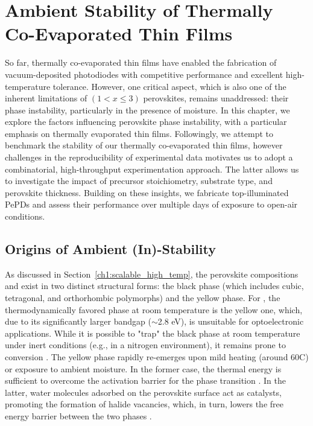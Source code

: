 \chapter{Ambient Stability of Thermally Co-Evaporated  Thin Films}\label{ch:stability}


So far, thermally co-evaporated  thin films have enabled the fabrication of vacuum-deposited photodiodes with competitive performance and excellent high-temperature tolerance. However, one critical aspect, which is also one of the inherent limitations of  $(1<x\leq3)$ perovskites, remains unaddressed: their phase instability, particularly in the presence of moisture. In this chapter, we explore the factors influencing perovskite phase instability, with a particular emphasis on thermally evaporated thin films. Followingly, we attempt to benchmark the stability of our thermally co-evaporated  thin films, however challenges in the reproducibility of experimental data motivates us to adopt a combinatorial, high-throughput experimentation approach. The latter allows us to investigate the impact of precursor stoichiometry, substrate type, and perovskite thickness. Building on these insights, we fabricate top-illuminated PePDs and assess their performance over multiple days of exposure to open-air conditions.


\section{Origins of Ambient (In)-Stability}

As discussed in Section~\ref{ch1:scalable_high_temp}, the perovskite compositions  and  exist in two distinct structural forms: the black phase (which includes cubic, tetragonal, and orthorhombic polymorphs) and the yellow phase. For , the thermodynamically favored phase at room temperature is the yellow one, which, due to its significantly larger bandgap ($\sim$2.8 eV), is unsuitable for optoelectronic applications. While it is possible to "trap" the black phase at room temperature under inert conditions (e.g., in a nitrogen environment), it remains prone to conversion \cite{Steele2021TrojansPerovskite}. The yellow phase rapidly re-emerges upon mild heating (around 60\degree C) or exposure to ambient moisture. In the former case, the thermal energy is sufficient to overcome the activation barrier for the phase transition \cite{Steele2019ThermalFilms}. In the latter, water molecules adsorbed on the perovskite surface act as catalysts, promoting the formation of halide vacancies, which, in turn, lowers the free energy barrier between the two phases \cite{Dastidar2016HighIodide, Kang2017HighCsPbBr3, Lin2018ThermochromicCells, Lin2021KineticsPerovskite}. 


